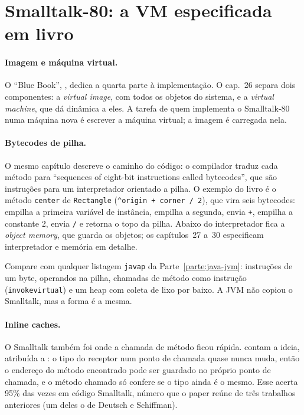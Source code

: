 \section{Smalltalk-80: a VM especificada em livro}
\label{sec:hist-smalltalk}

\paragraph{Imagem e máquina virtual.}
O \enquote{Blue Book}, 
\parencite{livro:goldberg1983}, dedica a quarta parte à implementação. O
cap.~26 separa dois componentes: a \emph{virtual image}, com todos
os objetos do sistema, e a \emph{virtual machine}, que dá dinâmica a
eles. A tarefa de quem implementa o Smalltalk-80 numa máquina nova é
escrever a máquina virtual; a imagem é carregada nela.

\paragraph{Bytecodes de pilha.}
O mesmo capítulo descreve o caminho do código: o compilador traduz cada
método para \enquote{sequences of eight-bit instructions called
bytecodes}, que são instruções para um interpretador orientado a pilha.
O exemplo do livro é o método \texttt{center} de \texttt{Rectangle}
(\texttt{\^{}origin + corner / 2}), que vira seis bytecodes: empilha a
primeira variável de instância, empilha a segunda, envia \texttt{+},
empilha a constante 2, envia \texttt{/} e retorna o topo da pilha. Abaixo
do interpretador fica a \emph{object memory}, que guarda os objetos; os
capítulos~27 a~30 especificam interpretador e memória em detalhe.

Compare com qualquer listagem \texttt{javap} da Parte~\ref{parte:java-jvm}: instruções de um
byte, operandos na pilha, chamadas de método como instrução
(\texttt{invokevirtual}) e um heap com coleta de lixo por baixo. A JVM
não copiou o Smalltalk, mas a forma é a mesma.

\paragraph{Inline caches.}
O Smalltalk também foi onde a chamada de método ficou rápida.
\textcite{paper:self-pics} contam a ideia, atribuída a
\textcite{paper:smalltalk-80-deutsch-schiffman}: o tipo do receptor num
ponto de chamada quase nunca muda, então o endereço do método encontrado
pode ser guardado no próprio ponto de chamada, e o método chamado só
confere se o tipo ainda é o mesmo. Esse
 acerta 95\% das vezes em
código Smalltalk, número que o paper reúne de três trabalhos anteriores
(um deles o de Deutsch e Schiffman).

